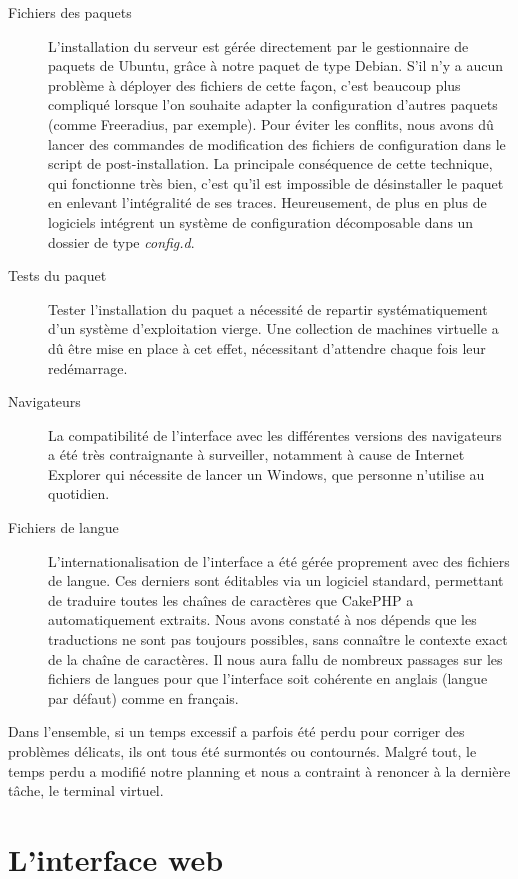\begin{description}
\item[Fichiers des paquets] L'installation du serveur est gérée directement par le gestionnaire de paquets de Ubuntu, grâce à notre paquet de type Debian. S'il n'y a aucun problème à déployer des fichiers de cette façon, c'est beaucoup plus compliqué lorsque l'on souhaite adapter la configuration d'autres paquets (comme Freeradius, par exemple). Pour éviter les conflits, nous avons dû lancer des commandes de modification des fichiers de configuration dans le script de post-installation. La principale conséquence de cette technique, qui fonctionne très bien, c'est qu'il est impossible de désinstaller le paquet en enlevant l'intégralité de ses traces. Heureusement, de plus en plus de logiciels intégrent un système de configuration décomposable dans un dossier de type \emph{config.d}.
\item[Tests du paquet] Tester l'installation du paquet a nécessité de repartir systématiquement d'un système d'exploitation vierge. Une collection de machines virtuelle a dû être mise en place à cet effet, nécessitant d'attendre chaque fois leur redémarrage.
\item[Navigateurs] La compatibilité de l'interface avec les différentes versions des navigateurs a été très contraignante à surveiller, notamment à cause de Internet Explorer qui nécessite de lancer un Windows, que personne n'utilise au quotidien.
\item[Fichiers de langue] L'internationalisation de l'interface a été gérée proprement avec des fichiers de langue. Ces derniers sont éditables via un logiciel standard, permettant de traduire toutes les chaînes de caractères que CakePHP a automatiquement extraits. Nous avons constaté à nos dépends que les traductions ne sont pas toujours possibles, sans connaître le contexte exact de la chaîne de caractères. Il nous aura fallu de nombreux passages sur les fichiers de langues pour que l'interface soit cohérente en anglais (langue par défaut) comme en français.
\end{description}

Dans l'ensemble, si un temps excessif a parfois été perdu pour corriger des problèmes délicats, ils ont tous été surmontés ou contournés. Malgré tout, le temps perdu a modifié notre planning et nous a contraint à renoncer à la dernière tâche, le terminal virtuel.

\section{L'interface web}
